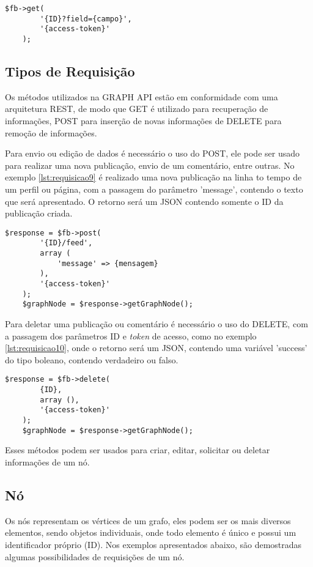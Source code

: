\begin{lstlisting}[caption={Requisição com o uso do ID+campo},label={lst:requisicoes3}]
	$fb->get(
		'{ID}?field={campo}',
   		'{access-token}'
	);
\end{lstlisting}

\subsection{Tipos de Requisição}
Os métodos utilizados na GRAPH API estão em conformidade com uma arquitetura REST, de modo que GET é utilizado para recuperação de informações, POST para inserção de novas informações de DELETE para remoção de informações.

Para envio ou edição de dados é necessário o uso do POST, ele pode ser usado para realizar uma nova publicação, envio de um comentário, entre outras. No exemplo \ref{lst:requisicao9} é realizado uma nova publicação na linha to tempo de um perfil ou página, com a passagem do parâmetro 'message', contendo o texto que será apresentado. O retorno será um JSON contendo somente o ID da publicação criada.

\begin{lstlisting}[caption={Requsição POST},label={lst:requisicao9}]
	$response = $fb->post(
   		'{ID}/feed',
    	array (
      		'message' => {mensagem}
    	),
    	'{access-token}'
  	);
	$graphNode = $response->getGraphNode();
\end{lstlisting}

Para deletar uma publicação ou comentário é necessário o uso do DELETE, com a passagem dos parâmetros ID e \textit{token} de acesso, como no exemplo \ref{lst:requisicao10}, onde o retorno será um JSON, contendo uma variável 'success' do tipo boleano, contendo verdadeiro ou falso.

\begin{lstlisting}[caption={Requsição DELETE},label={lst:requisicao10}]
	$response = $fb->delete(
    	{ID},
   		array (),
    	'{access-token}'
  	);
	$graphNode = $response->getGraphNode();
\end{lstlisting}

Esses métodos podem ser usados para criar, editar, solicitar ou deletar informações de um nó.

\subsection{Nó}
Os nós representam os vértices de um grafo, eles podem ser os mais diversos elementos, sendo objetos individuais, onde todo elemento é único e possui um identificador próprio (ID). Nos exemplos apresentados abaixo, são demostradas algumas possibilidades de requisições de um nó.

